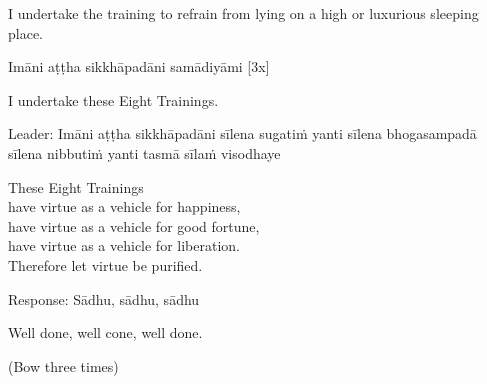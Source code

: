 \begin{english-verses}
  I undertake the training to refrain from lying on a high or luxurious sleeping place.
\end{english-verses}

Imāni aṭṭha sikkhāpadāni samādiyāmi \hfill{[3x]}

\begin{english-verses}
  I undertake these Eight Trainings.
\end{english-verses}

\begin{pali-hang}
  Leader: Imāni aṭṭha sikkhāpadāni sīlena sugatiṁ yanti sīlena bhogasampadā sīlena nibbutiṁ yanti tasmā sīlaṁ visodhaye
\end{pali-hang}

\begin{english-verses}
  These Eight Trainings\\
  have virtue as a vehicle for happiness,\\
  have virtue as a vehicle for good fortune,\\
  have virtue as a vehicle for liberation.\\
  Therefore let virtue be purified.\hyperlink{endnote141-appendix}{\hypertarget{endnote141-body}{}}
\end{english-verses}

Response: Sādhu, sādhu, sādhu

\begin{english}
\hspace{1.5cm} Well done, well cone, well done.
\end{english}

(Bow three times)

\clearpage
